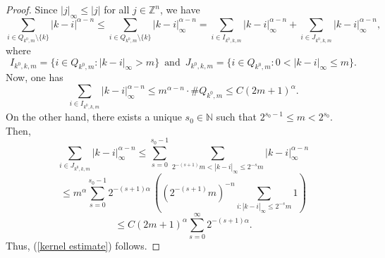 \documentclass[10pt,a4paper]{amsart}
\begin{document}
\begin{proof}
Since $|j|_{\infty} \leq |j|$ for all $j \in \mathbb{Z}^n$, we have
\[
\sum_{i \in Q_{k^0, m} \setminus \{ k \}} |k-i|^{\alpha - n} \leq \sum_{i \in Q_{k^0, m} \setminus \{ k \}} |k-i|^{\alpha - n}_{\infty}
= \sum_{i \in I_{k^0, k, m}} |k-i|^{\alpha - n}_{\infty} + \sum_{i \in J_{k^0, k, m}} |k-i|^{\alpha - n}_{\infty},
\]
where
\[
I_{k^0, k, m} = \{ i \in Q_{k^0, m} : |k-i|_{\infty} > m \} \,\,\, \text{and} \,\,\, J_{k^0, k, m} = \{ i \in Q_{k^0, m} : 0<|k-i|_{\infty} 
\leq m \}.
\]
Now, one has
\[
\sum_{i \in I_{k^0, k, m}} |k-i|^{\alpha - n}_{\infty} \leq m^{\alpha - n} \cdot \#Q_{k^0, m} \leq C (2m+1)^{\alpha}.
\]
On the other hand, there exists a unique $s_0 \in \mathbb{N}$ such that $2^{s_0 - 1} \leq m < 2^{s_0}$. Then,
\[
\sum_{i \in J_{k^0, k, m}} |k-i|^{\alpha - n}_{\infty} \leq \sum_{s=0}^{s_0 - 1} \sum_{2^{-(s+1)} m < |k-i|_{\infty} \leq 2^{-s} m} 
|k-i|^{\alpha - n}_{\infty}
\]
\[
\leq m^{\alpha} \sum_{s=0}^{s_0 - 1} 2^{-(s+1) \alpha} \, \left( (2^{-(s+1)} m)^{-n} \sum_{i: |k-i|_{\infty} \leq 2^{-s} m} 1 \right)
\]
\[
\leq C (2m+1)^{\alpha} \sum_{s=0}^{\infty} 2^{-(s+1) \alpha}.
\]
Thus, (\ref{kernel estimate}) follows.
\end{proof}
\end{document}
